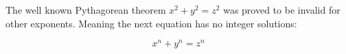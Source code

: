 \documentclass{article}
\begin{document}
The well known Pythagorean theorem \(x^2 + y^2 = z^2\) was 
proved to be invalid for other exponents. 
Meaning the next equation has no integer solutions:

\[ x^n + y^n = z^n \]
\end{document}
